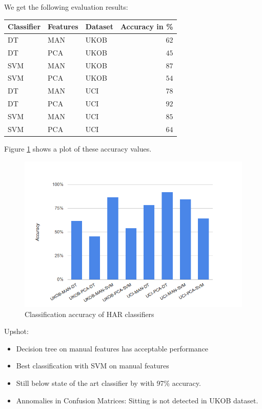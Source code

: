 We get the following evaluation results:
\begin{center}
\begin{tabular}{|lll|r|} \hline
  {\bf Classifier} & {\bf Features} & {\bf Dataset} & {\bf Accuracy in \%} \\ \hline
  DT	& MAN	& UKOB	&	$62$ \\ 
  DT	& PCA	& UKOB	&	$45$\\ 
  SVM	& MAN	& UKOB	&	$87$\\ 
  SVM	& PCA	& UKOB	&	$54$\\
  DT	& MAN	& UCI	&	$78$ \\ 
  DT	& PCA	& UCI	&	$92$ \\ 
  SVM	& MAN	& UCI	&	$85$ \\ 
  SVM	& PCA	& UCI	&	$64$ \\ \hline
\end{tabular}
\end{center}

Figure \ref{fig:har_eval} shows a plot of these accuracy values.

\begin{figure}[ht]
  \centering
  \includegraphics[width= 0.5 \textwidth]{img/har/accuracy_plot.png}
  \caption{Classification accuracy of HAR classifiers}
  \label{fig:har_eval}
\end{figure}


\pagebreak
{}

Upshot:
\begin{itemize}
\item  Decision tree on manual features has acceptable performance
\item  Best classification with SVM on manual features
\item  Still below state of the art classifier by \cite{Anguita} with 97\% accuracy.
\item  Annomalies in Confusion Matrices: Sitting is not detected in UKOB dataset.
\end{itemize}






